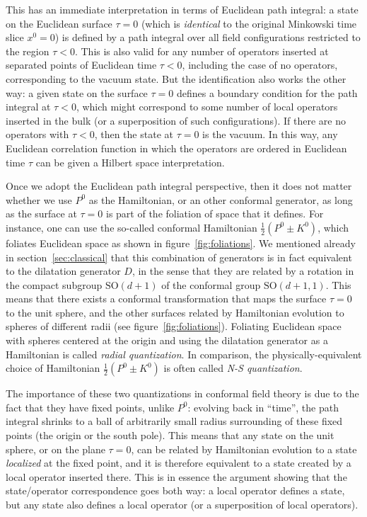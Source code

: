 \documentclass[a4paper,12pt]{article}
\newcommand{\SO}{\text{SO}}
\numberwithin{equation}{section}
\begin{document}
This has an immediate interpretation in terms of Euclidean path integral: 
a state on the Euclidean surface $\tau = 0$ (which is \emph{identical} to the original Minkowski time slice $x^0 = 0$) is defined by a path integral over all field configurations restricted to the region $\tau < 0$. This is also valid for any number of operators inserted at separated points of Euclidean time $\tau < 0$, including the case of no operators, corresponding to the vacuum state. But the identification also works the other way: a given state on the surface $\tau = 0$ defines a boundary condition for the path integral at $\tau < 0$, which might correspond to some number of local operators inserted in the bulk (or a superposition of such configurations). If there are no operators with $\tau < 0$, then the state at $\tau = 0$ is the vacuum.
In this way, any Euclidean correlation function in which the operators are ordered in Euclidean time $\tau$ can be given a Hilbert space interpretation.

Once we adopt the Euclidean path integral perspective, then it does not matter whether we use $P^0$ as the Hamiltonian, or an other conformal generator, as long as the surface at $\tau = 0$ is part of the foliation of space that it defines. For instance, one can use the so-called conformal Hamiltonian $\frac{1}{2} (P^0 \pm K^0)$, which foliates Euclidean space as shown in figure~\ref{fig:foliations}.
We mentioned already in section~\ref{sec:classical} that this combination of generators is in fact equivalent to the dilatation generator $D$, in the sense that they are related by a rotation in the compact subgroup $\SO(d + 1)$ of the conformal group $\SO(d+1, 1)$.
This means that there exists a conformal transformation that maps the surface $\tau = 0$ to the unit sphere, and the other surfaces related by Hamiltonian evolution to spheres of different radii (see figure~\ref{fig:foliations}).
Foliating Euclidean space with spheres centered at the origin and using the dilatation generator as a Hamiltonian is called \emph{radial quantization}. In comparison, the physically-equivalent choice of Hamiltonian  $\frac{1}{2} (P^0 \pm K^0)$ is often called \emph{N-S quantization}.

The importance of these two quantizations in conformal field theory is due to the fact that they have fixed points, unlike $P^0$: evolving back in ``time'', the path integral shrinks to a ball of arbitrarily small radius surrounding of these fixed points (the origin or the south pole). This means that any state on the unit sphere, or on the plane $\tau = 0$, can be related by Hamiltonian evolution to a state \emph{localized} at the fixed point, and it is therefore equivalent to a state created by a local operator inserted there.
This is in essence the argument showing that the state/operator correspondence goes both way: a local operator defines a state, but any state also defines a local operator (or a superposition of local operators).
\end{document}
